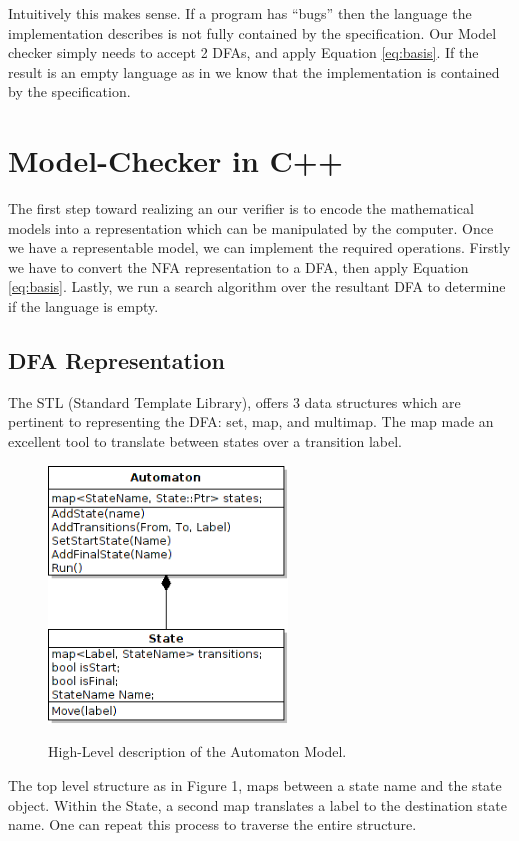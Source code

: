 \documentclass[12pt,journal,compsoc]{IEEEtran}
\theoremstyle{plain}%
\theoremstyle{definition}
\theoremstyle{remark}
\begin{document}
Intuitively this makes sense.  If a program has ``bugs'' then the language the
implementation describes is not fully contained by the specification.  Our Model checker simply
needs to accept 2 DFAs, and apply Equation \ref{eq:basis}.  If the result is an
empty language as in we know that the implementation is contained by the specification.

\section{Model-Checker in C++}
The first step toward realizing an our verifier is to encode the mathematical
models into a representation which can be manipulated by the computer. 
Once we have a representable model, we can implement the required operations.
Firstly we have to convert the NFA representation to a DFA, then apply Equation
\ref{eq:basis}. Lastly, we run a search algorithm over the resultant DFA to
determine if the language is empty.

\subsection{DFA Representation}
The STL (Standard Template Library), offers 3 data structures which are
pertinent to representing the DFA: set, map, and multimap. The map made an
excellent tool to translate between states over a transition label.  
\begin{figure}
    \begin{center}
        \includegraphics[width=2.5in]{UML.png}
        \label{fig:model}
        \caption{High-Level description of the Automaton Model.}
    \end{center}
\end{figure}
The top level structure as in Figure 1, maps between a state name
and the state object.  Within the State, a second map translates a label to the
destination state name. One can repeat this process to traverse the entire
structure.
\end{document}
